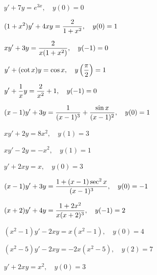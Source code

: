 \begin{exerciselist}
  \item\label{exer:2.1.25} \CGex $y'+7y=e^{3x},\quad y(0)=0$

  \item\label{exer:2.1.26} \CGex $\displaystyle{(1+x^{2})y'+4xy=\frac{2}{1+x^{2}},\quad y(0)=1}$

  \item\label{exer:2.1.27} \CGex $\displaystyle{xy'+3y=\frac{2}{x(1+x^{2})},\quad y(-1)=0}$

  \item\label{exer:2.1.28} \CGex $\displaystyle{y'+(\cot x)y=\cos x,\quad y\left(\frac{\pi}{2}\right)=1}$

  \item\label{exer:2.1.29} \CGex $\displaystyle{y'+\frac{1}{x}y=\frac{2}{x^{2}}+1,\quad y(-1)=0}$


  \item\label{exer:2.1.30}
        $\displaystyle{(x-1)y'+3y=\frac{1}{(x-1)^{3}}+ \frac{\sin x}{(x-1)^{2}},\quad y(0)=1}$

  \item\label{exer:2.1.31} $xy'+2y=8x^{2},\quad y(1)=3$

  \item\label{exer:2.1.32} $xy'-2y=-x^{2},\quad y(1)=1$

  \item\label{exer:2.1.33} $y'+2xy=x,\quad y(0)=3$

  \item\label{exer:2.1.34} $\displaystyle{(x-1)y'+3y=\frac{1+(x-1)\sec^{2}x}{(x-1)^{3}},\quad y(0)=-1}$

  \item\label{exer:2.1.35} $\displaystyle{(x+2)y'+4y=\frac{1+2x^{2}}{x(x+2)^{3}},\quad y(-1)=2}$

  \item\label{exer:2.1.36} $(x^{2}-1)y'-2xy=x(x^{2}-1),\quad y(0)=4$

  \item\label{exer:2.1.37} $(x^{2}-5)y'-2xy=-2x(x^{2}-5),\quad y(2)=7$


  \item\label{exer:2.1.38} $y'+2xy=x^{2},\quad y(0)=3$


\end{exerciselist}
